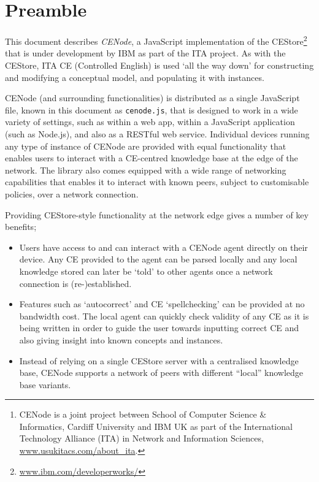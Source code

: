 \documentclass{scrartcl}
\title{\ce{cenode.js}}
\subtitle{Revision 1.1.2}
\author{W.M. Webberley \& A. Preece\footnote{CENode is a joint project between School of Computer Science \& Informatics, Cardiff University and IBM UK as part of the International Technology Alliance (ITA) in Network and Information Sciences, \href{http://www.usukitacs.com/about_ita}{www.usukitacs.com/about\_ita}.}\\ \href{http://cwenode.io}{cenode.io} $|$ \href{mailto:info@cenode.io}{info@cenode.io}}
\date{}
\newcommand{\js}[1]{\texttt{#1}}
\begin{document}
\maketitle

\section{Preamble}
This document describes \textit{CENode}, a JavaScript implementation of the CEStore\footnote{\href{https://www.ibm.com/developerworks/community/groups/service/html/communityview?communityUuid=558d55b6-78b6-43e6-9c14-0792481e4532}{www.ibm.com/developerworks/}} that is under development by IBM as part of the ITA project. As with the CEStore, ITA CE (Controlled English) is used `all the way down' for constructing and modifying a conceptual model, and populating it with instances. 

CENode (and surrounding functionalities) is distributed as a single JavaScript file, known in this document as \js{cenode.js}, that is designed to work in a wide variety of settings, such as within a web app, within a JavaScript application (such as Node.js), and also as a RESTful web service. Individual devices running any type of instance of CENode are provided with equal functionality that enables users to interact with a CE-centred knowledge base at the edge of the network. The library also comes equipped with a wide range of networking capabilities that enables it to interact with known peers, subject to customisable policies, over a network connection.

Providing CEStore-style functionality at the network edge gives a number of key benefits;
\begin{itemize}
    \item Users have access to and can interact with a CENode agent directly on their device. Any CE provided to the agent can be parsed locally and any local knowledge stored can later be `told' to other agents once a network connection is (re-)established.
    \item Features such as `autocorrect' and CE `spellchecking' can be provided at no bandwidth cost. The local agent can quickly check validity of any CE as it is being written in order to guide the user towards inputting correct CE and also giving insight into known concepts and instances.
    \item Instead of relying on a single CEStore server with a centralised knowledge base, CENode supports a network of peers with different ``local'' knowledge base variants.
\end{itemize}
\end{document}
